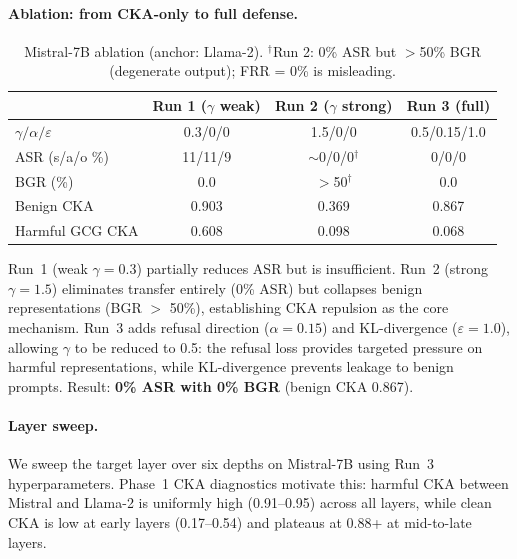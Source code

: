 \paragraph{Ablation: from CKA-only to full defense.}
\label{sec:ablation}

\begin{table}[ht]
\centering
\caption{Mistral-7B ablation (anchor: Llama-2). $^\dagger$Run 2: 0\% ASR but $>$50\% BGR (degenerate output); FRR = 0\% is misleading.}
\label{tab:mistral_ablation}
\begin{tabular}{lccc}
\toprule
 & Run 1 ($\gamma$ weak) & Run 2 ($\gamma$ strong) & Run 3 (full) \\
\midrule
$\gamma / \alpha / \varepsilon$ & 0.3/0/0 & 1.5/0/0 & 0.5/0.15/1.0 \\
ASR (s/a/o \%)   & 11/11/9 & $\sim$0/0/0$^\dagger$ & 0/0/0 \\
BGR (\%)         & 0.0     & $>$50$^\dagger$       & 0.0   \\
Benign CKA       & 0.903   & 0.369                 & 0.867 \\
Harmful GCG CKA  & 0.608   & 0.098                 & 0.068 \\
\bottomrule
\end{tabular}
\end{table}

Run~1 (weak $\gamma=0.3$) partially reduces ASR but is insufficient. Run~2 (strong $\gamma=1.5$) eliminates transfer entirely (0\% ASR) but collapses benign representations (BGR $>$ 50\%), establishing CKA repulsion as the core mechanism. Run~3 adds refusal direction ($\alpha=0.15$) and KL-divergence ($\varepsilon=1.0$), allowing $\gamma$ to be reduced to 0.5: the refusal loss provides targeted pressure on harmful representations, while KL-divergence prevents leakage to benign prompts. Result: \textbf{0\% ASR with 0\% BGR} (benign CKA 0.867).

\paragraph{Layer sweep.}
\label{sec:layer_sweep}

We sweep the target layer over six depths on Mistral-7B using Run~3 hyperparameters. Phase~1 CKA diagnostics motivate this: harmful CKA between Mistral and Llama-2 is uniformly high (0.91--0.95) across all layers, while clean CKA is low at early layers (0.17--0.54) and plateaus at 0.88+ at mid-to-late layers.


